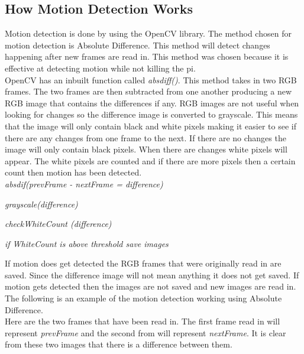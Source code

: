\documentclass[]{report}
\begin{document}
\subsection{How Motion Detection Works}
\label{subsec:motionworks}
Motion detection is done by using the OpenCV library. The method chosen for motion detection is Absolute Difference. This method will detect changes happening after new frames are read in. This method was chosen because it is effective at detecting motion while not killing the pi.\\

OpenCV has an inbuilt function called {\it absdiff()}. This method takes in two RGB frames. The two frames are then subtracted from one another producing a new RGB image that contains the differences if any. RGB images are not useful when looking for changes so the difference image is converted to grayscale. This means that the image will only contain black and white pixels making it easier to see if there are any changes from one frame to the next. If there are no changes the image will only contain black pixels. When there are changes white pixels will appear. The white pixels are counted and if there are more pixels then a certain count then motion has been detected.\\


	{\it absdif(prevFrame - nextFrame = difference)\\}

	{\it  grayscale(difference)\\}

	{\it  checkWhiteCount (difference)	\\}
	
	{\it  if WhiteCount is above threshold save images	\\}


If motion does get detected the RGB frames that were originally read in are saved. Since the difference image will not mean anything it does not get saved. If motion gets detected then the images are not saved and new images are read in.\\ 


The following is an example of the motion detection working using Absolute Difference.\\

Here are the two frames that have been read in. The first frame read in will represent {\it prevFrame} and the second from will represent {\it nextFrame}. It is clear from these two images that there is a difference between them. 
\end{document}
